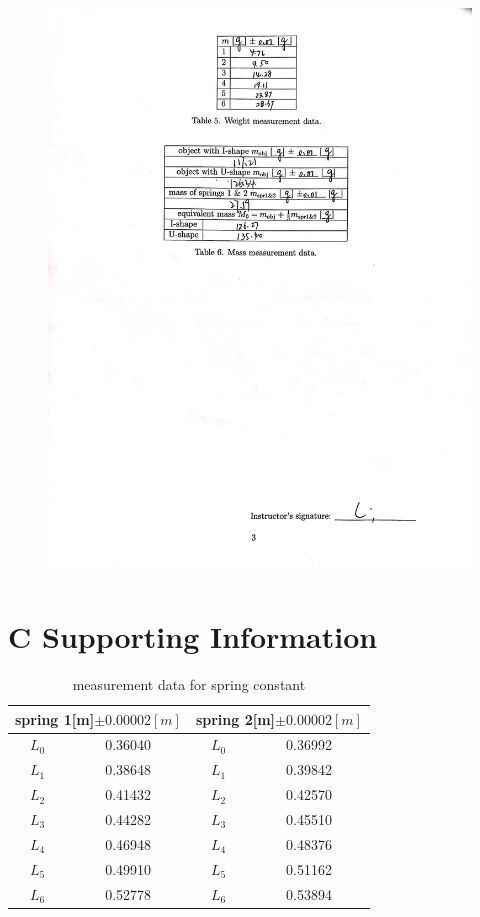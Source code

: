 \documentclass[11pt,a4paper]{article}
\begin{document}
\begin{figure}[H]
    \centering
    \includegraphics[scale=0.3]{data3.jpeg}

\end{figure}
\section*{C Supporting Information}
\begin{table}[h]
    \centering
    \begin{tabular}{|c|c||c|c|}\hline
    \multicolumn{2}{|c||}{spring 1[m]$\pm 0.00002[m]$}&\multicolumn{2}{c|}{spring 2[m]$\pm 0.00002[m]$}\\\hline
    $L_0$&   0.36040     &   $L_0$   &0.36992\\\hline
    $L_1$&0.38648&$L_1$& 0.39842\\\hline
    $L_2$&0.41432 & $L_2$&0.42570 \\\hline
    $L_3$& 0.44282  &$L_3$& 0.45510 \\\hline
    $L_4$&0.46948 & $L_4$&0.48376  \\\hline
    $L_5$&0.49910 & $L_5$&0.51162\\\hline
    $L_6$&0.52778 & $L_6$&0.53894 \\\hline
    \end{tabular}
    \caption{measurement data for spring constant}
    \label{measurespringconstant}
\end{table}
\end{document}
